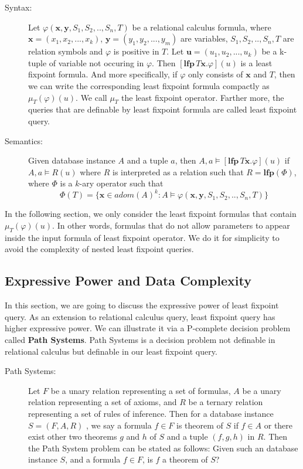\begin{description}

\item[Syntax:]
Let $\varphi(\textbf{x},\textbf{y}, S_1,S_2,..,S_n, T)$ be a relational calculus formula, where $\textbf{x}=(x_1, x_2,...,x_k)$, $\textbf{y}=(y_1,y_2,...,y_m)$ are variables, $S_1,S_2,..,S_n, T$ are relation symbols and $\varphi$ is positive in $T$. Let $\textbf{u}=(u_1, u_2,...,u_k)$ be a k-tuple of variable not occuring in $\varphi$. Then $[\textbf{lfp}\,T\textbf{x}.\varphi](u)$ is a least fixpoint formula. And more specifically, if $\varphi$ only consists of $\textbf{x}$ and $T$, then we can write the corresponding least fixpoint formula compactly as $\mu_T(\varphi)(u)$. We call $\mu_T$ the least fixpoint operator. Farther more, the queries that are definable by least fixpoint formula are called least fixpoint query.\\

\item[Semantics:]
Given database instance $A$ and a tuple $a$, then $A, a \models [\textbf{lfp}\,T\textbf{x}.\varphi](u)$ if $A, a \models R(u)$ where $R$ is interpreted as a relation such that $R=\textbf{lfp}(\Phi)$, where $\Phi$ is a $k$-ary operator such that
$$ \Phi(T) = \{\textbf{x}\in adom(A)^k: A\models \varphi(\textbf{x},\textbf{y},S_1,S_2,..,S_n,T)\}$$ 

\end{description}

In the following section, we only consider the least fixpoint formulas that contain $\mu_T(\varphi)(u)$. In other words, formulas that do not allow parameters to appear inside the input formula of least fixpoint operator. We do it for simplicity to avoid the complexity of nested least fixpoint queries.

\subsection{Expressive Power and Data Complexity}

In this section, we are going to discuss the expressive power of least fixpoint query. As an extension to relational calculus query, least fixpoint query has higher expressive power. We can illustrate it via a P-complete decision problem called \textbf{Path Systems}\cite{Cook}. Path Systems is a decision problem not definable in relational calculus but definable in our least fixpoint query. \\

\begin{description}
\item[Path Systems:]
Let $F$ be a unary relation representing a set of formulas, $A$ be a unary relation representing a set of axioms, and $R$ be a ternary relation representing a set of rules of inference. Then for a database instance $S = (F, A, R)$ , we say a formula $f\in F$ is theorem of $S$ if $f\in A$ or there exist other two theorems $g$ and $h$ of $S$ and a tuple $(f, g, h)$ in $R$. Then the Path System problem can be stated as follows: Given such an database instance $S$, and a formula $f\in F$, is $f$ a theorem of $S$?
\end{description}

